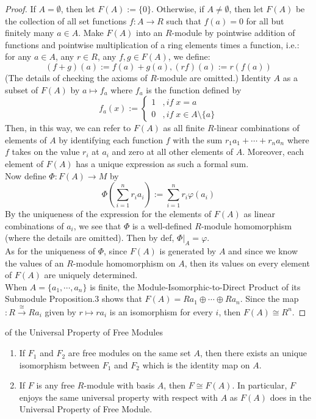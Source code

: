 \begin{proof}
    If $A=\emptyset$, then let $F(A):=\{0\}$. Otherwise, if $A \neq \emptyset$, then let $F(A)$ be the collection of all set functions $f:A \to R$ such that $f(a)=0$ for all but finitely many $a \in A$. Make $F(A)$ into an $R$-module by pointwise addition of functions and pointwise multiplication of a ring elements times a function, i.e.: for any $a\in A$, any $r\in R$, any $f,g \in F(A)$, we define:
    $$(f+g) (a) := f(a)+g(a) ,(rf)(a) := r(f(a))$$
    (The details of checking the axioms of $R$-module are omitted.) Identity $A$ as a subset of $F(A)$ by $a \mapsto f_a$ where $f_a$ is the function defined by
    $$f_a (x) :=\begin{cases}
        1 &,if\;x=a\\
        0 &,if\;x \in A \setminus \{a\}
    \end{cases}$$
    Then, in this way, we can refer to $F(A)$ as all finite $R$-linear combinations of elements of $A$ by identifying each function $f$ with the sum $r_1a_1+ \cdots +r_na_n$ where $f$ takes on the value $r_i$ at $a_i$ and zero at all other elements of $A$. Moreover, each element of $F(A)$ has a unique expression as such a formal sum.\\
    Now define $\Phi: F(A) \to M$ by
    $$\Phi (\sum_{i=1}^n r_ia_i) := \sum_{i=1}^n r_i \varphi(a_i)$$
    By the uniqueness of the expression for the elements of $F(A)$ as linear combinations of $a_i$, we see that $\Phi$ is a well-defined $R$-module homomorphism (where the details are omitted). Then by def, $\Phi|_A =\varphi$.\\
    As for the uniqueness of $\Phi$, since $F(A)$ is generated by $A$ and since we know the values of an $R$-module homomorphism on $A$, then its values on every element of $F(A)$ are uniquely determined.\\
    When $A= \{a_1 ,\cdots, a_n\}$ is finite, the Module-Isomorphic-to-Direct Product of its Submodule Proposition.3 shows that $F(A)= Ra_1 \oplus \cdots \oplus Ra_n$. Since the map$:R \overset{\cong}{\to} Ra_i$ given by $r \mapsto ra_i$ is an isomorphism for every $i$, then $F(A) \cong R^n$.
\end{proof}

\begin{corollary}{of the Universal Property of Free Modules}\\
\begin{enumerate}
    \item If $F_1$ and $F_2$ are free modules on the same set $A$, then there exists an unique isomorphism between $F_1$ and $F_2$ which is the identity map on $A$.

    \item If $F$ is any free $R$-module with basis $A$, then $F \cong F(A)$. In particular, $F$ enjoys the same universal property with respect with $A$ as $F(A)$ does in the Universal Property of Free Module.
\end{enumerate}
\end{corollary}

